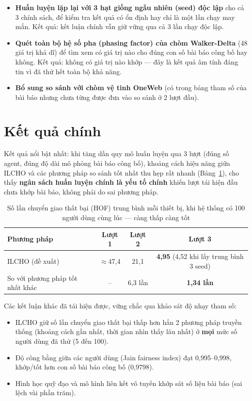 \documentclass[12pt,a4paper]{article}
\begin{document}
\begin{itemize}[leftmargin=1.2em]
  \item \textbf{Huấn luyện lặp lại với 3 hạt giống ngẫu nhiên (seed) độc lập} cho cả 3 chính
        sách, để kiểm tra kết quả có ổn định hay chỉ là một lần chạy may mắn. Kết quả: kết luận
        chính vẫn giữ vững qua cả 3 lần chạy độc lập.
  \item \textbf{Quét toàn bộ hệ số pha (phasing factor) của chòm Walker-Delta} (48 giá trị khả
        dĩ) để tìm xem có giá trị nào cho đúng con số bài báo công bố hay không. Kết quả: không
        có giá trị nào khớp — đây là kết quả âm tính đáng tin vì đã thử hết toàn bộ khả năng.
  \item \textbf{Bổ sung so sánh với chòm vệ tinh OneWeb} (có trong bảng tham số của bài báo
        nhưng chưa từng được đưa vào so sánh ở 2 lượt đầu).
\end{itemize}

\section{Kết quả chính}

Kết quả nổi bật nhất: khi tăng dần quy mô huấn luyện qua 3 lượt (đúng số agent, đúng độ dài
mô phỏng bài báo công bố), khoảng cách hiệu năng giữa ILCHO và các phương pháp so sánh tốt
nhất thu hẹp rất nhanh (Bảng~\ref{tab:hof}), cho thấy \textbf{ngân sách huấn luyện chính là yếu
tố chính} khiến lượt tái hiện đầu chưa khớp bài báo, không phải do sai phương pháp.

\begin{table}[h]
\centering
\caption{Số lần chuyển giao thất bại (HOF) trung bình mỗi thiết bị, khi hệ thống có 100 người
dùng cùng lúc — càng thấp càng tốt}
\label{tab:hof}
\begin{tabular}{lccc}
\toprule
\textbf{Phương pháp} & \textbf{Lượt 1} & \textbf{Lượt 2} & \textbf{Lượt 3} \\
\midrule
ILCHO (đề xuất)        & $\approx$47,4 & 21,1 & \textbf{4,95} (4,52 khi lấy trung bình 3 seed) \\
So với phương pháp tốt nhất khác & --   & 6,3 lần & \textbf{1,34 lần} \\
\bottomrule
\end{tabular}
\end{table}

Các kết luận khác đã tái hiện được, vững chắc qua khảo sát độ nhạy tham số:

\begin{itemize}[leftmargin=1.2em]
  \item ILCHO giữ số lần chuyển giao thất bại thấp hơn hẳn 2 phương pháp truyền thống
        (khoảng cách gần nhất, thời gian nhìn thấy lâu nhất) ở \textbf{mọi} mức số người dùng
        đã thử (5 đến 100).
  \item Độ công bằng giữa các người dùng (Jain fairness index) đạt 0,995--0,998, khớp/tốt hơn
        con số bài báo công bố (0,9798).
  \item Hình học quỹ đạo và mô hình liên kết vô tuyến khớp sát số liệu bài báo (sai lệch vài
        phần trăm).
\end{itemize}
\end{document}

